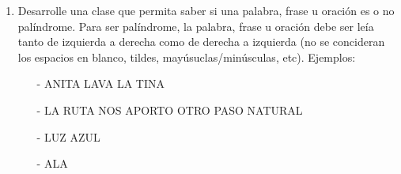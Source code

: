\documentclass{article}
\begin{document}
\begin{enumerate}
		\begin{enumerate}
			\item Caracter\'isticas: \emph{longitud} y \emph{contrasenia}. Por omisi\'on, la longitud ser\'a de 8 (puede ser modificada).
			\item Comportamiento: \textbf{esFuerte()}.
			\begin{enumerate}
				\item \emph{generarPassword}(): genera la contrase\~na del objeto, con la longitud que tenga.
				\item \emph{esFuerte}(): entrega un booleano si es fuerte o no (para ser fuerte, debe tener m\'as de 2 may\'usculas, m\'as de 1 min\'uscula y m\'as de 5 n\'umeros). Utilice el m\'etodo \emph{isUpperCase(char)} de clase Character para determinar si la letra es may\'uscula.
			\end{enumerate}
			\item[] Crear una clase externa que realice lo siguiente:
			\begin{enumerate}
				\item Instanciar 3 objetos con datos ingresados manualmente.
				\item Para cada objeto, se debe agregar una contrase\~na y verificar si es o no fuerte.
			\end{enumerate}
		\end{enumerate}
		\item Desarrolle una clase que permita saber si una palabra, frase u oraci\'on es o no pal\'indrome. Para ser pal\'indrome, la palabra, frase u oraci\'on debe ser le\'ia tanto de izquierda a derecha como de derecha a izquierda (no se concideran los espacios en blanco, tildes, may\'usuclas/min\'usculas, etc). Ejemplos:
		\begin{enumerate}
			\item[-] ANITA LAVA LA TINA 
			\item[-] LA RUTA NOS APORTO OTRO PASO NATURAL
			\item[-] LUZ AZUL 
			\item[-] ALA
		\end{enumerate}
%
%
%
%

\end{enumerate}
\end{document}
